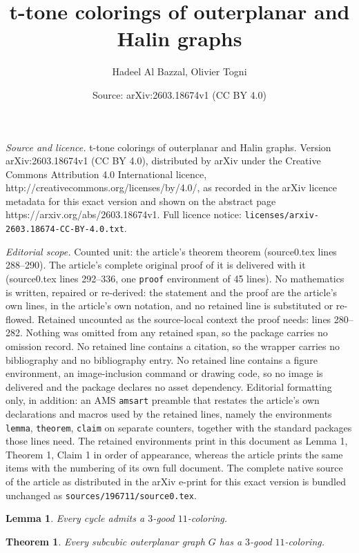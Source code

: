 \documentclass[10pt,a4paper]{amsart}
\title{t-tone colorings of outerplanar and Halin graphs}
\author{Hadeel Al Bazzal, Olivier Togni}
\date{Source: arXiv:2603.18674v1 (CC BY 4.0)}
\newtheorem{lemma}{Lemma}
\newtheorem{theorem}{Theorem}
\begin{document}
\maketitle

\noindent\emph{Source and licence.} t-tone colorings of outerplanar and Halin graphs. Version arXiv:2603.18674v1 (CC BY 4.0), distributed by arXiv under the Creative Commons Attribution 4.0 International licence, http://creativecommons.org/licenses/by/4.0/, as recorded in the arXiv licence metadata for this exact version and shown on the abstract page https://arxiv.org/abs/2603.18674v1. Full licence notice: \texttt{licenses/arxiv-2603.18674-CC-BY-4.0.txt}.\par\smallskip

\noindent\textit{Editorial scope.} Counted unit: the article's theorem theorem (source0.tex lines 288--290). The article's complete original proof of it is delivered with it (source0.tex lines 292--336, one \texttt{proof} environment of 45 lines). No mathematics is written, repaired or re-derived: the statement and the proof are the article's own lines, in the article's own notation, and no retained line is substituted or re-flowed.  Retained uncounted as the source-local context the proof needs: lines 280--282.  Nothing was omitted from any retained span, so the package carries no omission record.  No retained line contains a citation, so the wrapper carries no bibliography and no bibliography entry.  No retained line contains a figure environment, an image-inclusion command or drawing code, so no image is delivered and the package declares no asset dependency.  Editorial formatting only, in addition: an AMS \texttt{amsart} preamble that restates the article's own declarations and macros used by the retained lines, namely the environments \texttt{lemma}, \texttt{theorem}, \texttt{claim} on separate counters, together with the standard packages those lines need.  The retained environments print in this document as Lemma 1, Theorem 1, Claim 1 in order of appearance, whereas the article prints the same items with the numbering of its own full document.  The complete native source of the article as distributed in the arXiv e-print for this exact version is bundled unchanged as \texttt{sources/196711/source0.tex}.
\begin{lemma}\label{l3}
Every cycle admits a $3$-good $11$-coloring.
\end{lemma}

\begin{theorem}
    Every subcubic outerplanar graph $G$ has a $3$-good $11$-coloring.
\end{theorem}
\end{document}
